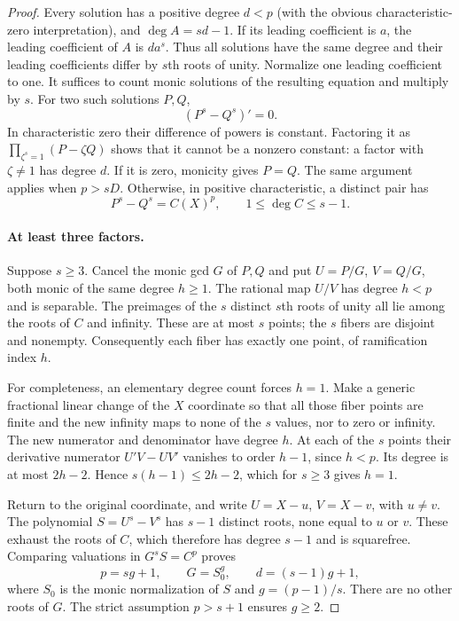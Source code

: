 \begin{proof}
Every solution has a positive degree $d<p$ (with the obvious
characteristic-zero interpretation), and
$\deg A=sd-1$. If its leading coefficient is $a$, the leading
coefficient of $A$ is $da^s$. Thus all solutions have the same degree
and their leading coefficients differ by $s$th roots of unity.
Normalize one leading coefficient to one. It suffices to count
monic solutions of the resulting equation and multiply by $s$.
For two such solutions $P,Q$,
\[
 (P^s-Q^s)'=0.
\]
In characteristic zero their difference of powers is constant.
Factoring it as $\prod_{\zeta^s=1}(P-\zeta Q)$ shows that it cannot
be a nonzero constant: a factor with $\zeta\ne1$ has degree $d$.
If it is zero, monicity gives $P=Q$. The same argument applies when
$p>sD$. Otherwise, in positive characteristic, a distinct pair has
\[
 P^s-Q^s=C(X)^p,\qquad 1\le\deg C\le s-1.
\]

\paragraph{At least three factors.}
Suppose $s\ge3$. Cancel the monic gcd $G$ of $P,Q$ and put
$U=P/G$, $V=Q/G$, both monic of the same degree $h\ge1$.
The rational map $U/V$ has degree $h<p$ and is separable.
The preimages of the $s$ distinct $s$th roots of unity all lie
among the roots of $C$ and infinity. These are at most $s$ points;
the $s$ fibers are disjoint and nonempty. Consequently each fiber
has exactly one point, of ramification index $h$.

For completeness, an elementary degree count forces $h=1$.
Make a generic fractional linear change of the $X$ coordinate so
that all those fiber points are finite and the new infinity maps
to none of the $s$ values, nor to zero or infinity. The new numerator
and denominator have degree $h$. At each of the $s$ points their
derivative numerator $U'V-UV'$ vanishes to order $h-1$, since
$h<p$. Its degree is at most $2h-2$. Hence
$s(h-1)\le2h-2$, which for $s\ge3$ gives $h=1$.

Return to the original coordinate, and write $U=X-u$, $V=X-v$,
with $u\ne v$. The polynomial $S=U^s-V^s$ has $s-1$ distinct
roots, none equal to $u$ or $v$. These exhaust the roots of $C$,
which therefore has degree $s-1$ and is squarefree. Comparing
valuations in $G^sS=C^p$ proves
\[
 p=sg+1,\qquad G=S_0^g,\qquad d=(s-1)g+1,
\]
where $S_0$ is the monic normalization of $S$ and $g=(p-1)/s$.
There are no other roots of $G$. The strict assumption $p>s+1$
ensures $g\ge2$.


\end{proof}
